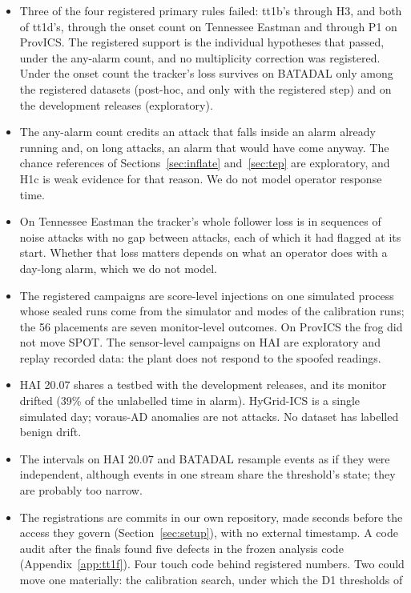 \documentclass[letterpaper,twocolumn,10pt]{article}
\begin{document}
\begin{itemize}
\item Three of the four registered primary rules failed: tt1b's through H3, and both of tt1d's, through
  the onset count on Tennessee Eastman and through P1 on ProvICS. The registered support is the
  individual hypotheses that passed, under the any-alarm count, and no multiplicity correction was
  registered. Under the onset count the tracker's loss survives on BATADAL only among the registered
  datasets (post-hoc, and only with the registered step) and on the development releases (exploratory).
\item The any-alarm count credits an attack that falls inside an alarm already running and, on long
  attacks, an alarm that would have come anyway. The chance references of Sections~\ref{sec:inflate}
  and~\ref{sec:tep} are exploratory, and H1c is weak evidence for that reason. We do not model operator
  response time.
\item On Tennessee Eastman the tracker's whole follower loss is in sequences of noise attacks with no gap
  between attacks, each of which it had flagged at its start. Whether that loss matters depends on
  what an operator does with a day-long alarm, which we do not model.
\item The registered campaigns are score-level injections on one simulated process whose sealed runs
  come from the simulator and modes of the calibration runs; the 56 placements are seven monitor-level
  outcomes. On ProvICS the frog did not move SPOT. The sensor-level campaigns on HAI are exploratory
  and replay recorded data: the plant does not respond to the spoofed readings.
\item HAI 20.07 shares a testbed with the development releases, and its monitor drifted (39\% of the
  unlabelled time in alarm). HyGrid-ICS is a single simulated day; voraus-AD anomalies are not attacks.
  No dataset has labelled benign drift.
\item The intervals on HAI 20.07 and BATADAL resample events as if they were independent, although
  events in one stream share the threshold's state; they are probably too narrow.
\item The registrations are commits in our own repository, made seconds before the access they govern
  (Section~\ref{sec:setup}), with no external timestamp. A code audit after the finals found five
  defects in the frozen analysis code (Appendix~\ref{app:tt1f}). Four touch code behind registered
  numbers. Two could move one materially: the calibration search, under which the D1 thresholds of

\end{itemize}
\end{document}
